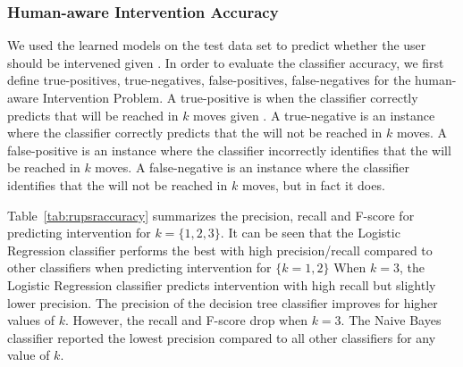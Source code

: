 \subsubsection{Human-aware Intervention Accuracy}
We used the learned models on the test data set to predict whether the user should be intervened given \historyDef. 
In order to evaluate the classifier accuracy, we first define true-positives, true-negatives, false-positives, false-negatives for the human-aware Intervention Problem. 
A true-positive is when the classifier correctly predicts that \undesired will be reached in $k$ moves given \historyDef.
A true-negative is an instance where the classifier correctly predicts that the \undesired will not be reached in $k$ moves.
A false-positive is an instance where the classifier incorrectly identifies that the \undesired will be reached in $k$ moves.
A false-negative is an instance where the classifier identifies that the \undesired will not be reached in $k$ moves, but in fact it does.


Table~\ref{tab:rupsraccuracy} summarizes the precision, recall and F-score for predicting intervention for $k=\lbrace 1,2,3 \rbrace$. 
It can be seen that the Logistic Regression classifier performs the best with high precision/recall compared to other classifiers when predicting intervention for $\lbrace k=1,2\rbrace$
When $k=3$, the Logistic Regression classifier predicts intervention with high recall but slightly lower precision. 
The precision of the decision tree classifier improves for higher values of $k$.
However, the recall and F-score drop when $k=3$.
The Naive Bayes classifier reported the lowest precision compared to all other classifiers for any value of $k$.

